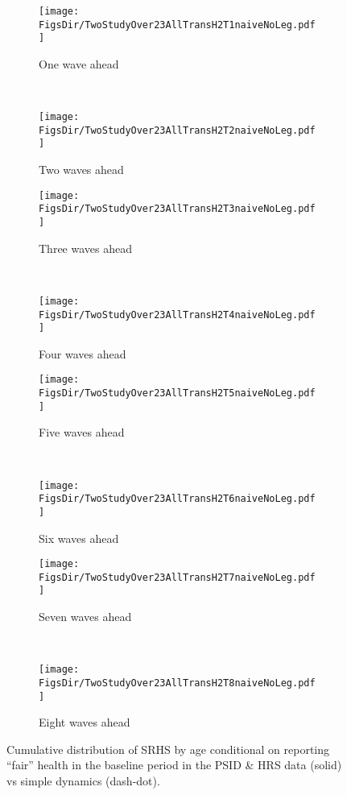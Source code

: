 \documentclass[12pt,pdftex,letterpaper]{article}
\newcommand{\RootDir}{..}
\newcommand{\FigsDir}{\RootDir/Figures}
\begin{document}
\begin{figure}
	\centering
	\begin{subfigure}[b]{0.45\textwidth}
		\texttt{[image: \\FigsDir/TwoStudyOver23AllTransH2T1naiveNoLeg.pdf]}
		\caption{One wave ahead}\label{fig:Naive1AheadFair}
	\end{subfigure}
	~
	\begin{subfigure}[b]{0.45\textwidth}
		\texttt{[image: \\FigsDir/TwoStudyOver23AllTransH2T2naiveNoLeg.pdf]}
		\caption{Two waves ahead}\label{fig:Naive2AheadFair}
	\end{subfigure}
	
	\begin{subfigure}[b]{0.45\textwidth}
		\texttt{[image: \\FigsDir/TwoStudyOver23AllTransH2T3naiveNoLeg.pdf]}
		\caption{Three waves ahead}\label{fig:Naive3AheadFair}
	\end{subfigure}
	~
	\begin{subfigure}[b]{0.45\textwidth}
		\texttt{[image: \\FigsDir/TwoStudyOver23AllTransH2T4naiveNoLeg.pdf]}
		\caption{Four waves ahead}\label{fig:Naive4AheadFair}
	\end{subfigure}
	
	\begin{subfigure}[b]{0.45\textwidth}
		\texttt{[image: \\FigsDir/TwoStudyOver23AllTransH2T5naiveNoLeg.pdf]}
		\caption{Five waves ahead}\label{fig:Naive5AheadFair}
	\end{subfigure}
	~
	\begin{subfigure}[b]{0.45\textwidth}
		\texttt{[image: \\FigsDir/TwoStudyOver23AllTransH2T6naiveNoLeg.pdf]}
		\caption{Six waves ahead}\label{fig:Naive6AheadFair}
	\end{subfigure}
	
	\begin{subfigure}[b]{0.45\textwidth}
		\texttt{[image: \\FigsDir/TwoStudyOver23AllTransH2T7naiveNoLeg.pdf]}
		\caption{Seven waves ahead}\label{fig:Naive7AheadFair}
	\end{subfigure}
	~
	\begin{subfigure}[b]{0.45\textwidth}
		\texttt{[image: \\FigsDir/TwoStudyOver23AllTransH2T8naiveNoLeg.pdf]}
		\caption{Eight waves ahead}\label{fig:Naive8AheadFair}
	\end{subfigure}
	\caption{Cumulative distribution of SRHS by age conditional on reporting ``fair'' health in the baseline period in the PSID \& HRS data (solid) vs simple dynamics (dash-dot).}\label{fig:NaiveTransFR}
\end{figure}
\end{document}
